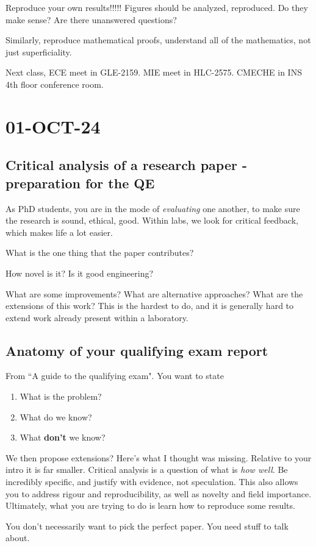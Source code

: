 \documentclass[10pt, oneside]{article}
\begin{document}
Reproduce your own results!!!!! Figures should be analyzed, reproduced. Do they make sense? Are there unanswered questions?

Similarly, reproduce mathematical proofs, understand all of the mathematics, not just superficiality. 

Next class, ECE meet in GLE-2159. MIE meet in HLC-2575. CMECHE in INS 4th floor conference room. 

\section{01-OCT-24}
\subsection{Critical analysis of a research paper - preparation for the QE}
As PhD students, you are in the mode of \textit{evaluating} one another, to make sure the research is sound, ethical, good. Within labs, we look for critical feedback, which makes life a lot easier.

What is the one thing that the paper contributes? 

How novel is it? Is it good engineering?

What are some improvements? What are alternative approaches? What are the extensions of this work? This is the hardest to do, and it is generally hard to extend work already present within a laboratory. 

\subsection{Anatomy of your qualifying exam report}
From ``A guide to the qualifying exam". You want to state \begin{enumerate}
    \item What is the problem?
    \item What do we know?
    \item What \textbf{don't} we know?
\end{enumerate}
We then propose extensions? Here's what I thought was missing. Relative to your intro it is far smaller. 
Critical analysis is a question of what is \textit{how well}. Be incredibly specific, and justify with evidence, not speculation. This also allows you to address rigour and reproducibility, as well as novelty and field importance. Ultimately, what you are trying to do is learn how to reproduce some results. 

You don't necessarily want to pick the perfect paper. You need stuff to talk about. 
\end{document}
